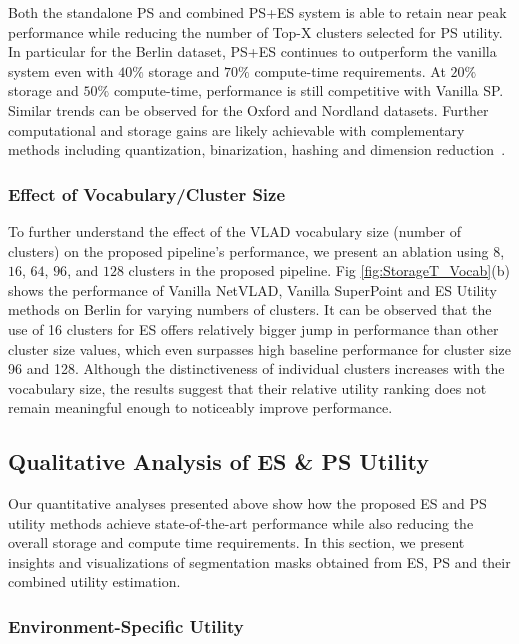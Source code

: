 \documentclass[letterpaper, 10 pt, conference]{ieeeconf}  \fi
\begin{document}
Both the standalone PS and combined PS+ES system is able to retain near peak performance while reducing the number of Top-X clusters selected for PS utility. In particular for the Berlin dataset, PS+ES continues to outperform the vanilla system even with $40\%$ storage and $70\%$ compute-time requirements. At $20\%$ storage and $50\%$ compute-time, performance is still competitive with Vanilla SP. Similar trends can be observed for the Oxford and Nordland datasets. Further computational and storage gains are likely achievable with complementary methods including quantization, binarization, hashing and dimension reduction~\cite{arroyo2015towards,vysotska2017relocalization,jegou2010aggregating}. 

\subsubsection{Effect of Vocabulary/Cluster Size}
\label{sec:vocabSize}
To further understand the effect of the VLAD vocabulary size (number of clusters) on the proposed pipeline's performance, we present an ablation using $8$, $16$, $64$, $96$, and $128$ clusters in the proposed pipeline. Fig \ref{fig:StorageT_Vocab}(b) shows the performance of Vanilla NetVLAD, Vanilla SuperPoint and ES Utility methods on Berlin for varying numbers of clusters. It can be observed that the use of 16 clusters for ES offers relatively bigger jump in performance than other cluster size values, which even surpasses high baseline performance for cluster size 96 and 128. Although the distinctiveness of individual clusters increases with the vocabulary size, the results suggest that their relative utility ranking does not remain meaningful enough to noticeably improve performance.

\subsection{Qualitative Analysis of ES \& PS Utility}
\label{sec:Qual}
Our quantitative analyses presented above show how the proposed ES and PS utility methods achieve state-of-the-art performance while also reducing the overall storage and compute time requirements. In this section, we present insights and visualizations of segmentation masks obtained from ES, PS and their combined utility estimation. 

\subsubsection{Environment-Specific Utility}
\label{sec:SemES}
\end{document}
